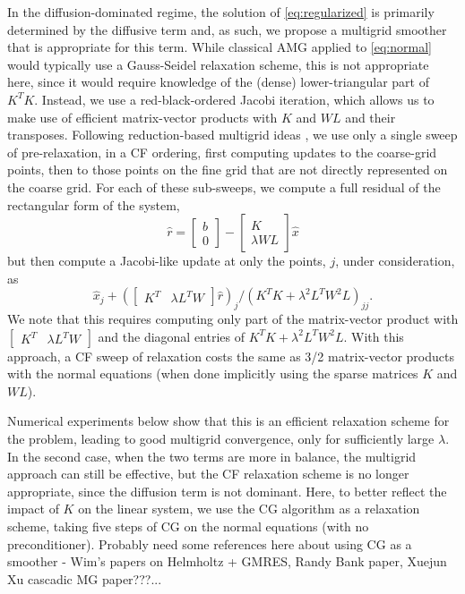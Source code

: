 \documentclass{article}
\begin{document}
In the diffusion-dominated regime, the solution of
\eqref{eq:regularized} is primarily determined by the diffusive term
and, as such, we propose a multigrid smoother that is appropriate for
this term.  While classical AMG applied to \eqref{eq:normal} would
typically use a Gauss-Seidel relaxation scheme, this is not
appropriate here, since it would require knowledge of the (dense)
lower-triangular part of $K^TK$.  Instead, we use a red-black-ordered
Jacobi iteration, which allows us to make use of efficient
matrix-vector products with $K$ and $WL$ and their transposes.
Following reduction-based multigrid ideas \cite{}, we use only a
single sweep of pre-relaxation, in a CF ordering, first computing
updates to the coarse-grid points, then to those points on the fine
grid that are not directly represented on the coarse grid.  For each
of these sub-sweeps, we compute a full residual of the rectangular
form of the system,
\[
\hat{r} = \left[\begin{array}{c} b \\ 0 \end{array}\right] -
\left[\begin{array}{c} K \\ \lambda WL\end{array}\right]\hat{x}
\]
but then compute a Jacobi-like update at only the points, $j$, under
consideration, as
\[
\hat{x}_j + {\left(\left[\begin{array}{cc} K^T & \lambda
      L^TW\end{array}\right]\hat{r}\right)_j}/{ \left(K^TK +
  \lambda^2L^TW^2L\right)_{jj}}.
\]
We note that this requires computing only part of the matrix-vector
product with $\left[\begin{array}{cc} K^T & \lambda
    L^TW\end{array}\right]$ and the diagonal entries of $K^TK +
\lambda^2L^TW^2L$.  With this approach, a CF sweep of relaxation costs
the same as 3/2 matrix-vector products with the normal equations (when
done implicitly using the sparse matrices $K$ and $WL$).

Numerical experiments below show that this is an efficient relaxation
scheme for the problem, leading to good multigrid convergence, only
for sufficiently large $\lambda$.  In the second case, when the two
terms are more in balance, the multigrid approach can still be
effective, but the CF relaxation scheme is no longer appropriate,
since the diffusion term is not dominant.  Here, to better reflect the
impact of $K$ on the linear system, we use the CG algorithm as a
relaxation scheme, taking five steps of CG on the normal equations
(with no preconditioner).  Probably need some references here about
using CG as a smoother - Wim's papers on Helmholtz + GMRES, Randy Bank
paper, Xuejun Xu cascadic MG paper???...
\end{document}
